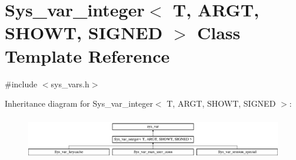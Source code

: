 \hypertarget{classSys__var__integer}{}\section{Sys\+\_\+var\+\_\+integer$<$ T, A\+R\+GT, S\+H\+O\+WT, S\+I\+G\+N\+ED $>$ Class Template Reference}
\label{classSys__var__integer}


{\ttfamily \#include $<$sys\+\_\+vars.\+h$>$}

Inheritance diagram for Sys\+\_\+var\+\_\+integer$<$ T, A\+R\+GT, S\+H\+O\+WT, S\+I\+G\+N\+ED $>$\+:\begin{figure}[H]
\begin{center}
\leavevmode
\includegraphics[height=1.898305cm]{classSys__var__integer}
\end{center}
\end{figure}
